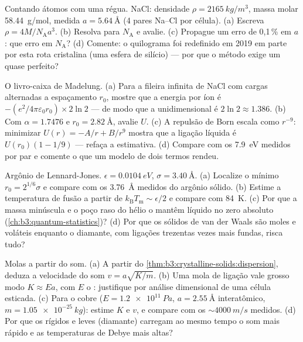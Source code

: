\begin{exercise}[$\star\star$]\label{exo:b3:crystalline-solids:6}
Contando átomos com uma régua. NaCl: densidade
$\rho = \qty{2165}{kg/m^3}$, massa molar \qty{58.44}{g/mol},
 medida $a = \qty{5.64}{\angstrom}$ (4 pares
Na--Cl por célula). (a) Escreva $\rho = 4M/N_{\text{A}}a^3$. (b) Resolva
para $N_{\text{A}}$ e avalie. (c) Propague um erro de 0,1\,\% em
$a$: que erro em $N_{\text{A}}$? (d) Comente: o quilograma
foi redefinido em 2019 em parte por esta rota cristalina (uma esfera de
silício) --- por que o método exige um  quase perfeito?
\end{exercise}

\begin{exercise}[$\star\star$]\label{exo:b3:crystalline-solids:7}
O livro-caixa de Madelung. (a) Para a fileira infinita de NaCl com
cargas alternadas a espaçamento $r_0$, mostre que a energia por íon é
$-(e^2/4\pi\varepsilon_0r_0)\times2\ln2$ --- de modo que a
 unidimensional é $2\ln2 \approx 1.386$. (b)
Com $\alpha = 1.7476$ e $r_0 = \qty{2.82}{\angstrom}$, avalie
$U$. (c) A repulsão de Born escala como $r^{-9}$: minimizar
$U(r) = -A/r + B/r^9$ mostra que a ligação líquida é $U(r_0)(1 - 1/9)$
--- refaça a estimativa. (d) Compare com os \qty{7.9}{eV} medidos
por par e comente o que um modelo de dois termos rendeu.
\end{exercise}

\begin{exercise}[$\star\star$]\label{exo:b3:crystalline-solids:8}
Argônio de Lennard-Jones. $\epsilon = \qty{0.0104}{eV}$, $\sigma =
\qty{3.40}{\angstrom}$. (a) Localize o mínimo $r_0 = 2^{1/6}
\sigma$ e compare com os \qty{3.76}{\angstrom} medidos do argônio
sólido. (b) Estime a temperatura de fusão a partir de
$k_{\text{B}}T_{\text{m}} \sim \epsilon/2$ e compare com
\qty{84}{K}. (c) Por que a massa minúscula e o poço raso do hélio o
mantêm líquido no zero absoluto (\cref{ch:b3:quantum-statistics})? (d)
Por que os sólidos de van der Waals são moles e voláteis enquanto o
diamante, com ligações trezentas vezes mais fundas, risca tudo?
\end{exercise}

\begin{exercise}[$\star\star$]\label{exo:b3:crystalline-solids:9}
Molas a partir do som. (a) A partir do
\cref{thm:b3:crystalline-solids:dispersion}, deduza a velocidade do
som $v = a\sqrt{K/m}$. (b) Uma mola de ligação vale grosso modo $K \approx
Ea$, com $E$ o : justifique por análise dimensional de
uma célula esticada. (c) Para o cobre ($E = \qty{1.2e11}{Pa}$,
$a = \qty{2.55}{\angstrom}$ interatômico, $m =
\qty{1.05e-25}{kg}$): estime $K$ e $v$, e compare com os
$\sim\qty{4000}{m/s}$ medidos. (d) Por que os  rígidos e leves
(diamante) carregam ao mesmo tempo o som mais rápido e as temperaturas
de Debye mais altas?
\end{exercise}

